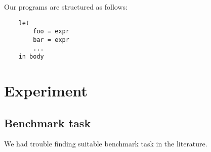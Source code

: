 \documentclass{article}
\begin{document}
Our programs are structured as follows:

\begin{verbatim}
    let
        foo = expr
        bar = expr
        ...
    in body
\end{verbatim}

\section{Experiment} %

\subsection{Benchmark task}


We had trouble finding suitable benchmark task in the literature.
\end{document}
